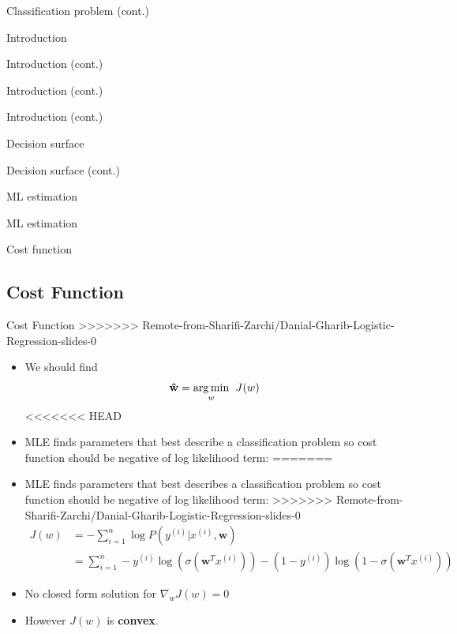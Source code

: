 \documentclass[serif, aspectratio=169]{beamer}
\begin{document}
\begin{frame}{Classification problem (cont.)}
\begin{itemize}
\begin{frame}{Introduction}
\begin{itemize}
\begin{frame}{Introduction (cont.)}
\begin{frame}{Introduction (cont.)}
\begin{frame}{Introduction (cont.)}
\begin{frame}{Decision surface}
\begin{itemize}
\begin{frame}{Decision surface (cont.)}
\begin{frame}{ML estimation}
\begin{frame}{ML estimation}
\begin{itemize}
\begin{frame}{Cost function}
\subsection{Cost Function}
\begin{frame}{Cost Function}
>>>>>>> Remote-from-Sharifi-Zarchi/Danial-Gharib-Logistic-Regression-slides-0
    \begin{itemize}
    \item We should find 
        \begin{align*}
            \mathbf{\hat{w}} = \underset{w}{\arg\min} \hspace{0.2cm} J(w)
        \end{align*}
<<<<<<< HEAD
        \item MLE finds parameters that best describe a classification problem so cost function should be negative of log likelihood term:
=======
        \item MLE finds parameters that best describes a classification problem so cost function should be negative of log likelihood term:
>>>>>>> Remote-from-Sharifi-Zarchi/Danial-Gharib-Logistic-Regression-slides-0
        \begin{align*}
            J(w) &= -\sum_{i=1}^{n} \log P(y^{(i)}|x^{(i)}, \mathbf{w})\\
            &= \sum_{i=1}^{n}-y^{(i)}\log (\sigma (\mathbf{w}^T x^{(i)})) - 
            (1-y^{(i)})\log (1 - \sigma (\mathbf{w}^T x^{(i)}))
        \end{align*}
        \item No closed form solution for $\nabla _w J(w) = 0$
        \item However $J(w)$ is \textbf{convex}.
    \end{itemize}
\end{frame}


\end{frame}
\end{itemize}
\end{frame}
\end{frame}
\end{frame}
\end{itemize}
\end{frame}
\end{frame}
\end{frame}
\end{frame}
\end{itemize}
\end{frame}
\end{itemize}
\end{frame}
\end{document}
